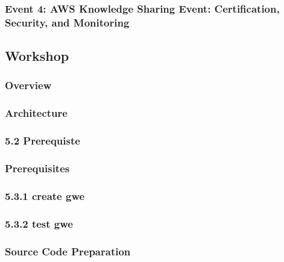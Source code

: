 \subsubsection{Event 4: AWS Knowledge Sharing Event: Certification, Security, and Monitoring}


\newpage

\subsection{Workshop}

\subsubsection{Overview}


\subsubsection{Architecture}


\subsubsection{5.2 Prerequiste}


\subsubsection{Prerequisites}




\subsubsection{5.3.1 create gwe}


\subsubsection{5.3.2 test gwe}




\subsubsection{Source Code Preparation}


